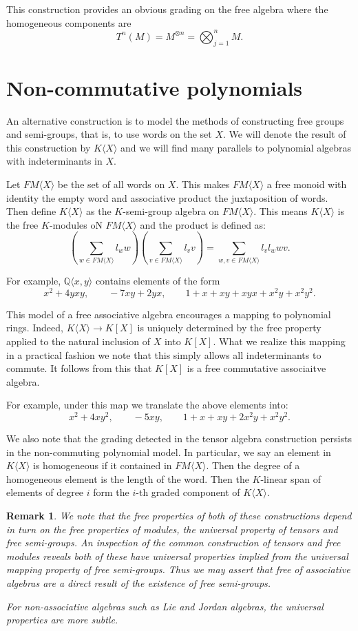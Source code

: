 \documentclass[12pt]{article}
\newtheorem{remark}[thm]{Remark}
\begin{document}
This construction provides an obvious grading on the free algebra where
the homogeneous components are 
   \[T^n(M)=M^{\otimes n}=\bigotimes_{j=1}^n M.\]

\section{Non-commutative polynomials}

An alternative construction is to model the methods of constructing free
groups and semi-groups, that is, to use words on the set $X$.  We will
denote the result of this construction by $K\langle X\rangle$ and we will
find many parallels to polynomial algebras with indeterminants in $X$.

Let $FM\langle X\rangle$ be the set of all words on $X$.  This makes
$FM\langle X\rangle$ a free monoid with identity the empty word and 
associative product the juxtaposition of words.  Then define 
$K\langle X\rangle$ as the $K$-semi-group algebra on $FM\langle X\rangle$.
This means $K\langle X\rangle$ is the free $K$-modules oN $FM\langle X\rangle$
and the product is defined as:
   \[\left(\sum_{w\in FM\langle X\rangle} l_w w\right)
     \left(\sum_{v\in FM\langle X\rangle} l_v v\right)
     =\sum_{w,v\in FM\langle X\rangle} l_v l_w wv.\] 

For example, $\mathbb{Q}\langle x,y\rangle$ contains elements of the form
   \[x^2+4yxy,\qquad -7xy+2yx,\qquad 1+x+xy+xyx+x^2y+x^2y^2.\]

This model of a free associative algebra encourages a mapping to polynomial
rings.  Indeed, $K\langle X\rangle\rightarrow K[X]$ is uniquely determined by
the free property applied to the natural inclusion of $X$ into $K[X]$.
What we realize this mapping in a practical fashion we note that this simply
allows all indeterminants to commute.  It follows from this that $K[X]$ is
a free commutative associaitve algebra.

For example, under this map we translate the above elements into:
   \[x^2+4xy^2,\qquad -5xy,\qquad 1+x+xy+2x^2y+x^2y^2.\]


We also note that the grading detected in the tensor algebra construction
persists in the non-commuting polynomial model.  In particular, we say an
element in $K\langle X\rangle$ is homogeneous if it contained in
$FM\langle X\rangle$.  Then the degree of a homogeneous element is the
length of the word.  Then the $K$-linear span of elements of degree $i$
form the $i$-th graded component of $K\langle X\rangle$.


\begin{remark}
We note that the free properties of both of these constructions depend
in turn on the free properties of modules, the universal property of
tensors and free semi-groups.  An inspection of the common construction
of tensors and free modules reveals both of these have universal properties
implied from the universal mapping property of free semi-groups.  Thus
we may assert that free of associative algebras are a direct result of
the existence of free semi-groups.  

For non-associative algebras such as Lie and Jordan algebras, the 
universal properties are more subtle.
\end{remark}


\end{document}
